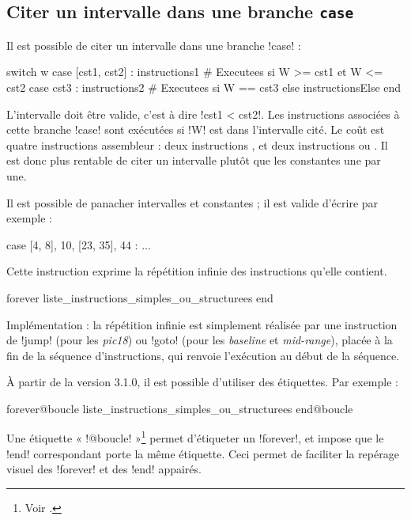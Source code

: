 \subsection{Citer un intervalle dans une branche \texttt{case}}

Il est possible de citer un intervalle dans une branche \pic!case! :
\begin{piccolo}
switch w
case [cst1, cst2] :
  instructions1 # Executees si W >= cst1 et W <= cst2
case cst3 :
  instructions2 # Executees si W == cst3
else
  instructionsElse
end
\end{piccolo}

L'intervalle doit être valide, c'est à dire \pic!cst1 < cst2!. Les instructions associées à cette branche \pic!case! sont exécutées si \pic!W! est dans l'intervalle cité. Le coût est quatre instructions assembleur : deux instructions , et deux instructions  ou  . Il est donc plus rentable de citer un intervalle plutôt que les constantes une par une.

Il est possible de panacher intervalles et constantes ; il est valide d'écrire par exemple :
\begin{piccolo}
case [4, 8], 10, [23, 35], 44 : ...
\end{piccolo}








Cette instruction exprime la répétition infinie des instructions qu'elle contient.
\begin{piccolo}
forever
  liste_instructions_simples_ou_structurees
end
\end{piccolo}

Implémentation : la répétition infinie est simplement réalisée par une instruction de \pic!jump! (pour les \emph{pic18}) ou \pic!goto! (pour les \emph{baseline} et \emph{mid-range}), placée à la fin de la séquence d'instructions, qui renvoie l'exécution au début de la séquence.

À partir de la version 3.1.0, il est possible d'utiliser des étiquettes. Par exemple :
\begin{piccolo}
forever@boucle
  liste_instructions_simples_ou_structurees
end@boucle
\end{piccolo}

Une étiquette « \pic!@boucle! »\footnote{Voir .} permet d'étiqueter un \pic!forever!, et impose que le \pic!end! correspondant porte la même étiquette. Ceci permet de faciliter la repérage visuel des  \pic!forever! et des \pic!end! appairés.



